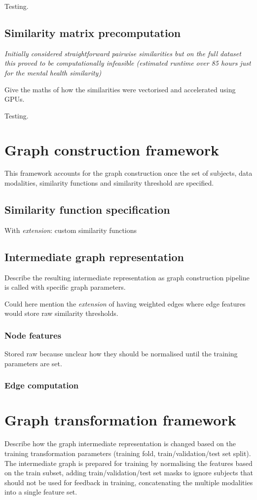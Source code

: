 Testing.

\subsection{Similarity matrix precomputation}
\textit{Initially considered straightforward pairwise similarities but on the full dataset this proved to be computationally infeasible (estimated runtime over 85 hours just for the mental health similarity)}

Give the maths of how the similarities were vectorised and accelerated using GPUs.

Testing.

\section{Graph construction framework}
This framework accounts for the graph construction once the set of subjects, data modalities, similarity functions and similarity threshold are specified.


\subsection{Similarity function specification}
With \textit{extension}: custom similarity functions


\subsection{Intermediate graph representation}
Describe the resulting intermediate representation as graph construction pipeline is called with specific graph parameters.

Could here mention the \textit{extension} of having weighted edges where edge features would store raw similarity thresholds.

\subsubsection{Node features}
Stored raw because unclear how they should be normalised until the training parameters are set.

\subsubsection{Edge computation}



\section{Graph transformation framework}
Describe how the graph intermediate representation is changed based on the training transformation parameters (training fold, train/validation/test set split). The intermediate graph is prepared for training by normalising the features based on the train subset, adding train/validation/test set masks to ignore subjects that should not be used for feedback in training, concatenating the multiple modalities into a single feature set.

